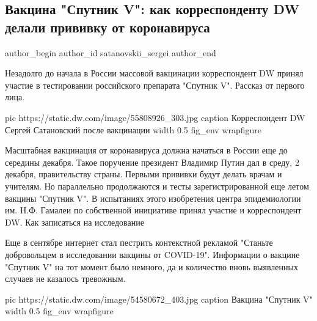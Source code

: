  
 
 
 
 
 
\subsection{Вакцина "Спутник V": как корреспонденту DW делали прививку от коронавируса}
\label{sec:03_12_2020.news.dw.satanovskii_sergei.1.sputnik_v_dw_journalist}
\ifcmt
	author_begin
   author_id satanovskii_sergei
	author_end
\fi

Незадолго до начала в России массовой вакцинации корреспондент DW принял
участие в тестировании российского препарата "Спутник V". Рассказ от первого
лица.


\ifcmt
	pic https://static.dw.com/image/55808926_303.jpg
	caption Корреспондент DW Сергей Сатановский после вакцинации
	width 0.5
	fig_env wrapfigure
\fi

Масштабная вакцинация от коронавируса должна начаться в России еще до середины
декабря. Такое поручение президент Владимир Путин дал в среду, 2 декабря,
правительству страны. Первыми прививки будут делать врачам и учителям. Но
параллельно продолжаются и тесты зарегистрированной еще летом вакцины "Спутник
V". В испытаниях этого изобретения центра эпидемиологии им. Н.Ф. Гамалеи по
собственной инициативе принял участие и корреспондент DW.  Как записаться на
исследование

Еще в сентябре интернет стал пестрить контекстной рекламой "Станьте
добровольцем в исследовании вакцины от COVID-19". Информации о вакцине "Спутник
V" на тот момент было немного, да и количество вновь выявленных случаев не
казалось тревожным.

\ifcmt
	pic https://static.dw.com/image/54580672_403.jpg
	caption Вакцина "Спутник V"
	width 0.5
	fig_env wrapfigure
\fi

